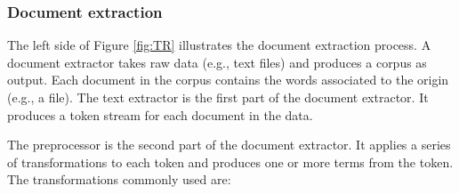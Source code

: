 \documentclass[12pt,draft]{Manuscript}
\begin{document}
\begin{body}
\subsubsection{Document extraction}\label{document-extraction}

The left side of Figure \ref{fig:TR} illustrates the document extraction
process. A document extractor takes raw data (e.g., text files) and
produces a corpus as output. Each document in the corpus contains the
words associated to the origin (e.g., a file). The text extractor is the
first part of the document extractor. It produces a token stream for
each document in the data.

The preprocessor is the second part of the document extractor. It
applies a series of transformations to each token and produces one or
more terms from the token. The transformations commonly used are:


\end{body}
\end{document}
